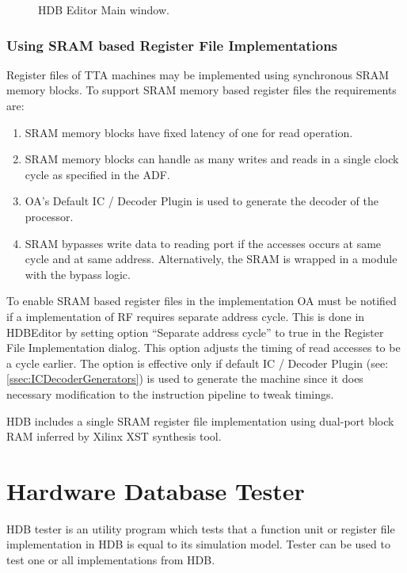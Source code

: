 \documentclass[a4paper,twoside]{tceusermanual}
\begin{document}
\begin{figure}[tb]
\centerline{}
\caption{HDB Editor Main window.}
\label{fig:hdbeditor_main_window}
\end{figure}

\subsubsection{Using SRAM based Register File Implementations}
Register files of TTA machines may be implemented using synchronous
SRAM memory blocks. To support SRAM memory based register files the
requirements are:

\begin{enumerate}
  \item SRAM memory blocks have fixed latency of one for read operation.
  \item SRAM memory blocks can handle as many writes and reads in a
    single clock cycle as specified in the ADF.
  \item OA's Default IC / Decoder Plugin is used to generate the
    decoder of the processor.
  \item \label{itm:bypass_req} SRAM bypasses write data to reading
    port if the accesses occurs at same cycle and at same
    address. Alternatively, the SRAM is wrapped in a module with the
    bypass logic.
\end{enumerate}

To enable SRAM based register files in the implementation OA must be
notified if a implementation of RF requires separate address
cycle. This is done in HDBEditor by setting option ``Separate address
cycle'' to true in the Register File Implementation dialog. This
option adjusts the timing of read accesses to be a cycle earlier. The
option is effective only if default IC / Decoder Plugin (see:
\ref{ssec:ICDecoderGenerators}) is used to generate the machine since
it does necessary modification to the instruction pipeline to tweak
timings.

HDB includes a single SRAM register file implementation using
dual-port block RAM inferred by Xilinx XST synthesis tool.

\section{Hardware Database Tester}
\label{sec:hdbtester}

HDB tester is an utility program which tests that a function unit or register
file implementation in HDB is equal to its simulation model. Tester can be used
to test one or all implementations from HDB.
\end{document}
